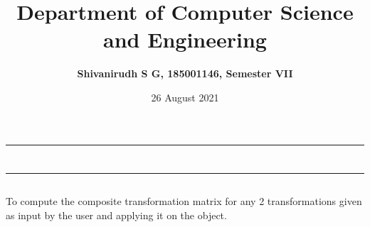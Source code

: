 \documentclass[9pt,letterpaper]{article}
\title{\textbf{Department of Computer Science and Engineering}}
\author{\textbf{Shivanirudh S G, 185001146, Semester VII }}
\date{26 August 2021}
\begin{document}
\maketitle
\hrule
\section*{}
\hrule 
\bigskip\bigskip

\subsection*{}

\subsection*{}
\begin{flushleft}
     To compute the composite transformation matrix for any 2 transformations given as input by the user and applying it on the object.
\end{flushleft}

\subsection*{}
\begin{flushleft}




\end{flushleft}
\newpage
\end{document}
